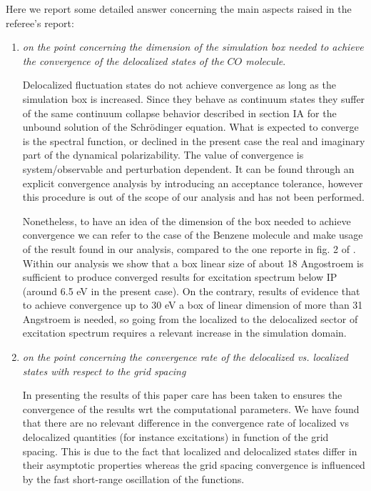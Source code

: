 \documentclass[11pt,a4paper]{article}
\begin{document}
Here we report some detailed answer concerning the main aspects raised in the referee's report:
\begin{enumerate}
  \item \emph{on the point concerning the dimension of the simulation box needed to achieve the convergence of the delocalized states of the $CO$ molecule}. 
  
  Delocalized fluctuation states do not achieve convergence as long as the simulation box is increased. Since they behave as continuum states they suffer of the same continuum collapse behavior described in section IA for the unbound solution of the Schr\"odinger equation. What is expected to converge is the spectral function, or declined in the present case the real and imaginary part of the dynamical polarizability. 
  The value of convergence is system/observable and perturbation dependent. It can be found through an explicit convergence analysis by introducing an acceptance tolerance, however this procedure is out of the scope of our analysis and has not been performed. 
  
  Nonetheless, to have an idea of the dimension of the box needed to achieve convergence we can refer to the case of the Benzene molecule and make usage
  of the result found in our analysis, compared to the one reporte in fig. 2 of \cite{baroni2008}. Within our analysis we show that a box linear size of about 18 Angostroem is sufficient to produce converged results for excitation spectrum below IP (around 6.5 eV in the present case). On the contrary, results of \cite{baroni2008} evidence that to achieve convergence up to 30 eV a box of linear dimension of more than 31 Angstroem is needed, so going from the localized to the delocalized sector of excitation spectrum requires a relevant increase in the simulation domain. 
  
  \item \emph{on the point concerning the convergence rate of the delocalized vs. localized states with respect
  to the grid spacing}
  
 In presenting the results of this paper care has been taken to ensures the convergence of the results wrt the computational parameters. We have found that there are no relevant difference in the convergence rate of localized vs delocalized quantities (for instance excitations) in function of the grid spacing. This is due to the fact that localized and delocalized states differ in their asymptotic properties whereas the grid spacing convergence is influenced by the fast short-range oscillation of the functions.
 

\end{enumerate}
\end{document}

